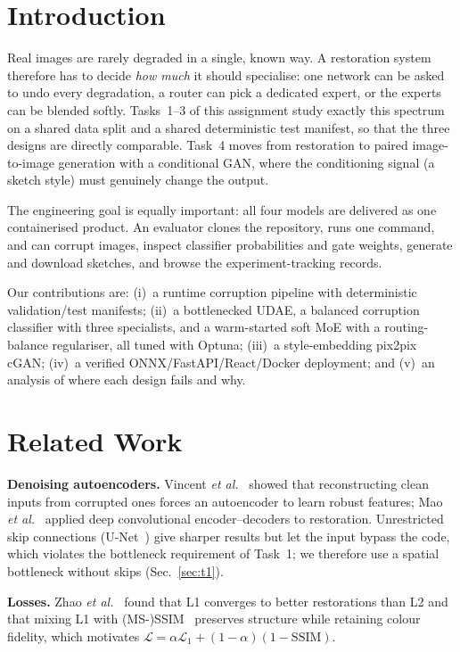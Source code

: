 \documentclass[conference]{IEEEtran}
\begin{document}
\section{Introduction}
Real images are rarely degraded in a single, known way. A restoration system therefore has to decide \emph{how much} it should specialise: one network can be asked to undo every degradation, a router can pick a dedicated expert, or the experts can be blended softly. Tasks~1--3 of this assignment study exactly this spectrum on a shared data split and a shared deterministic test manifest, so that the three designs are directly comparable. Task~4 moves from restoration to paired image-to-image generation with a conditional GAN, where the conditioning signal (a sketch style) must genuinely change the output.

The engineering goal is equally important: all four models are delivered as one containerised product. An evaluator clones the repository, runs one command, and can corrupt images, inspect classifier probabilities and gate weights, generate and download sketches, and browse the experiment-tracking records.

Our contributions are: (i)~a runtime corruption pipeline with deterministic validation/test manifests; (ii)~a bottlenecked UDAE, a balanced corruption classifier with three specialists, and a warm-started soft MoE with a routing-balance regulariser, all tuned with Optuna; (iii)~a style-embedding pix2pix cGAN; (iv)~a verified ONNX/FastAPI/React/Docker deployment; and (v)~an analysis of where each design fails and why.

\section{Related Work}
\textbf{Denoising autoencoders.} Vincent \emph{et al.}~\cite{vincent2008} showed that reconstructing clean inputs from corrupted ones forces an autoencoder to learn robust features; Mao \emph{et al.}~\cite{mao2016} applied deep convolutional encoder--decoders to restoration. Unrestricted skip connections (U-Net~\cite{ronneberger2015}) give sharper results but let the input bypass the code, which violates the bottleneck requirement of Task~1; we therefore use a spatial bottleneck without skips (Sec.~\ref{sec:t1}).

\textbf{Losses.} Zhao \emph{et al.}~\cite{zhao2017} found that L1 converges to better restorations than L2 and that mixing L1 with (MS-)SSIM~\cite{wang2004} preserves structure while retaining colour fidelity, which motivates $\mathcal{L}=\alpha\mathcal{L}_1+(1-\alpha)(1-\mathrm{SSIM})$.
\end{document}
